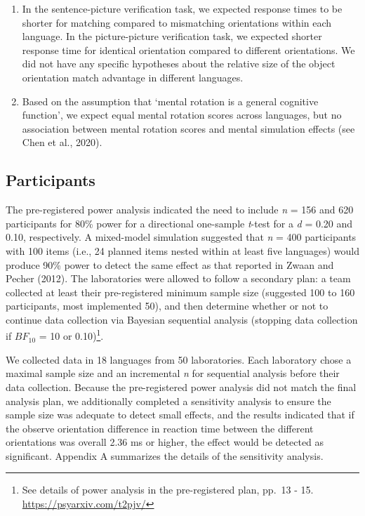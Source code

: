 \documentclass[
  man,floatsintext]{apa7}
\begin{document}
\begin{enumerate}
\def\labelenumi{(\arabic{enumi})}
\item
  In the sentence-picture verification task, we expected response
  times to be shorter for matching compared to mismatching
  orientations within each language. In the picture-picture
  verification task, we expected shorter response time for identical
  orientation compared to different orientations. We did not have any
  specific hypotheses about the relative size of the object
  orientation match advantage in different languages.
\item
  Based on the assumption that `mental rotation is a general cognitive
  function', we expect equal mental rotation scores across languages,
  but no association between mental rotation scores and mental
  simulation effects (see Chen et al., 2020).
\end{enumerate}

\hypertarget{participants}{%
\subsection{Participants}\label{participants}}

The pre-registered power analysis indicated the need to include \emph{n} =
156 and 620 participants for 80\% power for a directional one-sample
\emph{t}-test for a \emph{d} = 0.20 and 0.10, respectively. A mixed-model
simulation suggested that \emph{n} = 400 participants with 100 items (i.e.,
24 planned items nested within at least five languages) would produce
90\% power to detect the same effect as that reported in
Zwaan and Pecher (2012). The laboratories were allowed to
follow a secondary plan: a team collected at least their pre-registered
minimum sample size (suggested 100 to 160 participants, most implemented
50), and then determine whether or not to continue data collection via
Bayesian sequential analysis (stopping data collection if \(BF_{10}\) = 10
or 0.10)\footnote{See details of power analysis in the pre-registered plan, pp.~13 -
  15. \url{https://psyarxiv.com/t2pjv/}}.

We collected data in 18 languages from
50 laboratories. Each
laboratory chose a maximal sample size and an incremental \emph{n} for
sequential analysis before their data collection. Because the
pre-registered power analysis did not match the final analysis plan, we
additionally completed a sensitivity analysis to ensure the sample size
was adequate to detect small effects, and the results indicated that if
the observe orientation difference in reaction time between the
different orientations was overall 2.36 ms or higher, the effect would
be detected as significant. Appendix A summarizes the details of the
sensitivity analysis.
\end{document}
